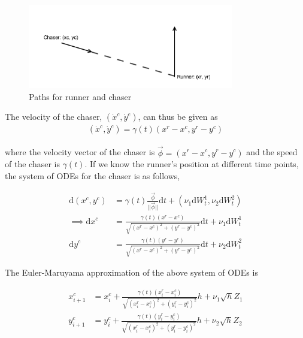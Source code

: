 \documentclass[graybox]{svmult}
\begin{document}
\begin{figure}
\centering
\includegraphics[width=0.8\textwidth]{pursuit.png}
\caption{Paths for runner and chaser}
\end{figure}

The velocity of the chaser, $(\dot{x}^c, \dot{y}^c)$, can thus be given as
\begin{align*}
(\dot{x}^c, \dot{y}^c) = \gamma(t) (x^{r} - x^{c}, y^{r} - y^{c})
\end{align*}

where the velocity vector of the chaser is $\vec{\phi} = (x^{r} - x^{c}, y^{r} - y^{c})$ and the speed of the chaser is $\gamma(t)$. If we know the runner's position at different time points, the system of ODEs for the chaser is as follows,

\begin{align*}
\mathrm{d}(x^{c}, y^{c}) & = \gamma(t) \frac{\vec{\phi}}{||\vec{\phi}||} \mathrm{d}t + (\nu_1 \mathrm{d}W^1_t, \nu_2 \mathrm{d}W^2_t) \\
\implies \mathrm{d} x^{c} & = \frac{\gamma(t) (x^{r} - x^{c})}{\sqrt{(x^{r} - x^{c})^2 + (y^{r} - y^{c})^2}} \mathrm{d}t + \nu_1 \mathrm{d}W^1_t \\
\mathrm{d} y^{c} & = \frac{\gamma(t) (y^{r} - y^{c})}{\sqrt{(x^{r} - x^{c})^2 + (y^{r} - y^{c})^2}} \mathrm{d}t + \nu_2 \mathrm{d} W^2_t
\end{align*}

The Euler-Maruyama approximation of the above system of ODEs is

\begin{align*}
x^{c}_{i+1} & = x^{c}_{i} + \frac{\gamma(t) (x^{r}_{i} - x^{c}_{i})}{\sqrt{(x^{r}_{i} - x^{c}_{i})^2 + (y^{r}_{i} - y^{c}_{i})^2}} h + \nu_1 \sqrt{h} Z_1 \\
y^{c}_{i+1} & = y^{c}_{i} + \frac{\gamma(t) (y^{r}_{i} - y^{c}_{i})}{\sqrt{(x^{r}_{i} - x^{c}_{i})^2 + (y^{r}_{i} - y^{c}_{i})^2}}h + \nu_2 \sqrt{h} Z_2
\end{align*}
\end{document}
